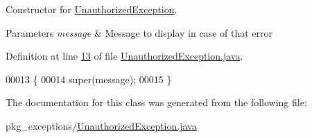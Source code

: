 Constructor for \hyperlink{classpkg__exceptions_1_1UnauthorizedException}{Unauthorized\-Exception}. 


\begin{DoxyParams}{Parameters}
{\em message} & Message to display in case of that error \\
\hline
\end{DoxyParams}


Definition at line \hyperlink{UnauthorizedException_8java_source_l00013}{13} of file \hyperlink{UnauthorizedException_8java_source}{Unauthorized\-Exception.\-java}.


\begin{DoxyCode}
00013                                                 \{
00014         super(message);
00015     \}
\end{DoxyCode}


The documentation for this class was generated from the following file\-:\begin{DoxyCompactItemize}
\item 
pkg\-\_\-exceptions/\hyperlink{UnauthorizedException_8java}{Unauthorized\-Exception.\-java}\end{DoxyCompactItemize}
